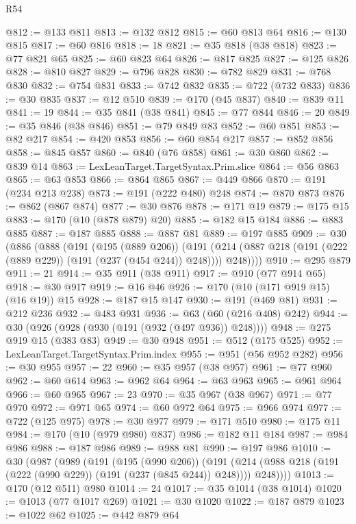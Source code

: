 \begin{lexlean}{R54}
\begin{coremodule}
{{{{{{{{{{{{{{{{{{{{{{{{{{{{{{{{{{{{{{{{{{{{{{{{{{@812 := @133 @811
@813 := @132 @812
@815 := @60 @813 @64
@816 := @130 @815
@817 := @60 @816
@818 := 18
@821 := @35 @818 (@38 @818)
@823 := @77 @821 @65
@825 := @60 @823 @64
@826 := @817 @825
@827 := @125 @826
@828 := @810 @827
@829 := @796 @828
@830 := @782 @829
@831 := @768 @830
@832 := @754 @831
@833 := @742 @832
@835 := @722 (@732 @833)
@836 := @30 @835
@837 := @12 @510
@839 := @170 (@45 @837)
@840 := @839 @11
@841 := 19
@844 := @35 @841 (@38 @841)
@845 := @77 @844
@846 := 20
@849 := @35 @846 (@38 @846)
@851 := @79 @849 @83
@852 := @60 @851
@853 := @82 @217
@854 := @420 @853
@856 := @60 @854 @217
@857 := @852 @856
@858 := @845 @857
@860 := @840 (@76 @858)
@861 := @30 @860
@862 := @839 @14
@863 := LexLeanTarget.TargetSyntax.Prim.slice
@864 := @56 @863
@865 := @63 @853
@866 := @864 @865
@867 := @449 @866
@870 := @191 (@234 @213 @238)
@873 := @191 (@222 @480) @248
@874 := @870 @873
@876 := @862 (@867 @874)
@877 := @30 @876
@878 := @171 @19
@879 := @175 @15
@883 := @170 (@10 (@878 @879) @20)
@885 := @182 @15 @184
@886 := @883 @885
@887 := @187 @885
@888 := @887 @81
@889 := @197 @885
@909 := @30
    (@886
      (@888
        (@191
          (@195 (@889 @206))
          (@191 (@214 (@887 @218 (@191 (@222 (@889 @229)) (@191 (@237 (@454 @244)) @248)))) @248))))
@910 := @295 @879
@911 := 21
@914 := @35 @911 (@38 @911)
@917 := @910 (@77 @914 @65)
@918 := @30 @917
@919 := @16 @46
@926 := @170 (@10 (@171 @919 @15) (@16 @19)) @15
@928 := @187 @15 @147
@930 := @191 (@469 @81)
@931 := @212 @236
@932 := @483 @931
@936 := @63 (@60 (@216 @408) @242)
@944 := @30 (@926 (@928 (@930 (@191 (@932 (@497 @936)) @248))))
@948 := @275 @919 @15 (@383 @83)
@949 := @30 @948
@951 := @512 (@175 @525)
@952 := LexLeanTarget.TargetSyntax.Prim.index
@955 := @951 (@56 @952 @282)
@956 := @30 @955
@957 := 22
@960 := @35 @957 (@38 @957)
@961 := @77 @960
@962 := @60 @614
@963 := @962 @64
@964 := @63 @963
@965 := @961 @964
@966 := @60 @965
@967 := 23
@970 := @35 @967 (@38 @967)
@971 := @77 @970
@972 := @971 @65
@974 := @60 @972 @64
@975 := @966 @974
@977 := @722 (@125 @975)
@978 := @30 @977
@979 := @171 @510
@980 := @175 @11
@984 := @170 (@10 (@979 @980) @837)
@986 := @182 @11 @184
@987 := @984 @986
@988 := @187 @986
@989 := @988 @81
@990 := @197 @986
@1010 := @30
    (@987
      (@989
        (@191
          (@195 (@990 @206))
          (@191 (@214 (@988 @218 (@191 (@222 (@990 @229)) (@191 (@237 (@845 @244)) @248)))) @248))))
@1013 := @170 (@12 @511) @980
@1014 := 24
@1017 := @35 @1014 (@38 @1014)
@1020 := @1013 (@77 @1017 @269)
@1021 := @30 @1020
@1022 := @187 @879
@1023 := @1022 @62
@1025 := @442 @879 @64
}}}}}}}}}}}}}}}}}}}}}}}}}}}}}}}}}}}}}}}}}}}}}}}}}}
\end{coremodule}
\end{lexlean}
